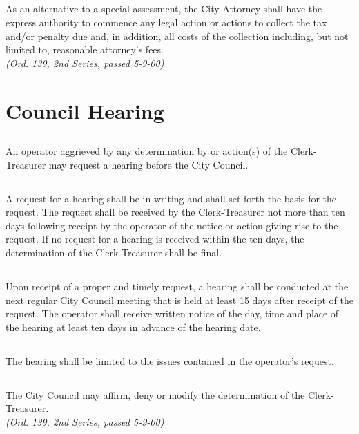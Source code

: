 \subsection{}
As an alternative to a special assessment, the City Attorney shall have the express authority to commence any legal action or actions to collect the tax and/or penalty due and, in addition, all costs of the collection including, but not limited to, reasonable attorney’s fees.\\
\emph{(Ord. 139, 2nd Series, passed 5-9-00)}

\section{Council Hearing}
\subsection{}
An operator aggrieved by any determination by or action(s) of the Clerk-Treasurer may request a hearing before the City Council.
\subsection{}
A request for a hearing shall be in writing and shall set forth the basis for the request.  The request shall be received by the Clerk-Treasurer not more than ten days following receipt by the operator of the notice or action giving rise to the request.  If no request for a hearing is received within the ten days, the determination of the Clerk-Treasurer shall be final.
\subsection{}
Upon receipt of a proper and timely request, a hearing shall be conducted at the next regular City Council meeting that is held at least 15 days after receipt of the request.  The operator shall receive written notice of the day, time and place of the hearing at least ten days in advance of the hearing date.
\subsection{}
The hearing shall be limited to the issues contained in the operator’s request.
\subsection{}
The City Council may affirm, deny or modify the determination of the Clerk-Treasurer.\\
\emph{(Ord. 139, 2nd Series, passed 5-9-00)}

